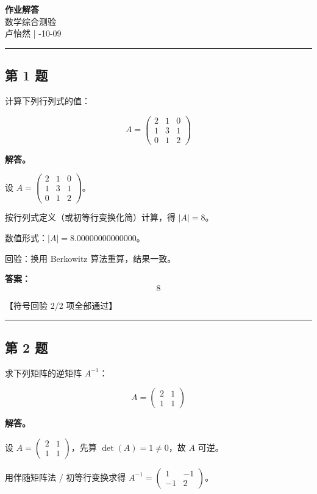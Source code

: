 \documentclass[12pt, a4paper]{article}
\newcommand{\problem}[1]{\subsection*{第 #1 题}}
\newcommand{\solution}{\textbf{解答。}}
\begin{document}
\begin{center}
    {\LARGE\bfseries 作业解答} \\[0.5em]
    {\large 数学综合测验} \\[0.3em]
    卢怡然 \quad | -10-09
\end{center}

\hrule
\vspace{1em}
\setlength{\parskip}{0.35em}
\problem{1}

计算下列行列式的值：

$$
A = \begin{pmatrix} 2 & 1 & 0 \\ 1 & 3 & 1 \\ 0 & 1 & 2 \end{pmatrix}
$$

\solution

设 $A = \begin{pmatrix} 2 & 1 & 0 \\ 1 & 3 & 1 \\ 0 & 1 & 2 \end{pmatrix}$。

按行列式定义（或初等行变换化简）计算，得 $|A| = 8$。

数值形式：$|A| = 8.00000000000000$。

回验：换用 Berkowitz 算法重算，结果一致。

\textbf{答案：}
\[\boxed{8}\]

\textcolor{okgreen}{【符号回验 2/2 项全部通过】}

\vspace{0.8em}
\hrule
\vspace{0.8em}

\problem{2}

求下列矩阵的逆矩阵 $A^{-1}$：

$$
A = \begin{pmatrix} 2 & 1 \\ 1 & 1 \end{pmatrix}
$$

\solution

设 $A = \begin{pmatrix} 2 & 1 \\ 1 & 1 \end{pmatrix}$，先算 $\det(A) = 1 \neq 0$，故 $A$ 可逆。

用伴随矩阵法 / 初等行变换求得 $A^{-1} = \begin{pmatrix} 1 & -1 \\ -1 & 2 \end{pmatrix}$。
\end{document}
